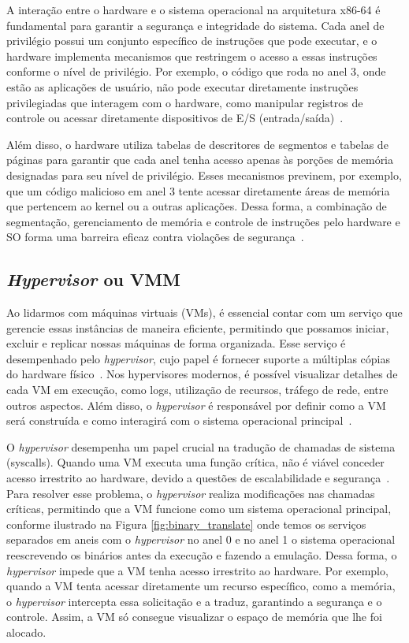 A interação entre o hardware e o sistema operacional na arquitetura x86-64 é fundamental para garantir a segurança e integridade do sistema. Cada anel de privilégio possui um conjunto específico de instruções que pode executar, e o hardware implementa mecanismos que restringem o acesso a essas instruções conforme o nível de privilégio. Por exemplo, o código que roda no anel 3, onde estão as aplicações de usuário, não pode executar diretamente instruções privilegiadas que interagem com o hardware, como manipular registros de controle ou acessar diretamente dispositivos de E/S (entrada/saída)~\citep{chirammal2016mastering}. 

Além disso, o hardware utiliza tabelas de descritores de segmentos e tabelas de páginas para garantir que cada anel tenha acesso apenas às porções de memória designadas para seu nível de privilégio. Esses mecanismos previnem, por exemplo, que um código malicioso em anel 3 tente acessar diretamente áreas de memória que pertencem ao kernel ou a outras aplicações. Dessa forma, a combinação de segmentação, gerenciamento de memória e controle de instruções pelo hardware e SO forma uma barreira eficaz contra violações de segurança~\citep{chirammal2016mastering}.


\subsection{\textit{Hypervisor} ou VMM}

Ao lidarmos com máquinas virtuais (VMs), é essencial contar com um serviço que gerencie essas instâncias de maneira eficiente, permitindo que possamos iniciar, excluir e replicar nossas máquinas de forma organizada. Esse serviço é desempenhado pelo \textit{hypervisor}, cujo papel é fornecer suporte a múltiplas cópias do hardware físico~\citep{modernOS}. Nos hypervisores modernos, é possível visualizar detalhes de cada VM em execução, como logs, utilização de recursos, tráfego de rede, entre outros aspectos. Além disso, o \textit{hypervisor} é responsável por definir como a VM será construída e como interagirá com o sistema operacional principal~\citep{chirammal2016mastering}.

O \textit{hypervisor} desempenha um papel crucial na tradução de chamadas de sistema (syscalls). Quando uma VM executa uma função crítica, não é viável conceder acesso irrestrito ao hardware, devido a questões de escalabilidade e segurança~\citep{modernOS}. Para resolver esse problema, o \textit{hypervisor} realiza modificações nas chamadas críticas, permitindo que a VM funcione como um sistema operacional principal, conforme ilustrado na Figura \ref{fig:binary_translate} onde temos os serviços separados em aneis com o \textit{hypervisor} no anel 0 e no anel 1 o sistema operacional reescrevendo os binários antes da execução e fazendo a emulação. Dessa forma, o \textit{hypervisor} impede que a VM tenha acesso irrestrito ao hardware. Por exemplo, quando a VM tenta acessar diretamente um recurso específico, como a memória, o \textit{hypervisor} intercepta essa solicitação e a traduz, garantindo a segurança e o controle. Assim, a VM só consegue visualizar o espaço de memória que lhe foi alocado.

